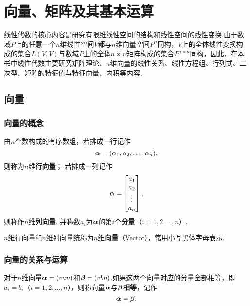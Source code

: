 \chapter{向量、矩阵及其基本运算}
线性代数的核心内容是研究有限维线性空间的结构和线性空间的线性变换.由于数域\(P\)上的任意一个\(n\)维线性空间\(V\)都与\(n\)维向量空间\(P^n\)同构，\(V\)上的全体线性变换构成的集合\(L(V,V)\)与数域\(P\)上的全体\(n \times n\)矩阵构成的集合\(P^{n \times n}\)同构，因此，在本书中线性代数主要研究矩阵理论、\(n\)维向量的线性关系、线性方程组、行列式、二次型、矩阵的特征值与特征向量、内积等内容.

\section{向量}
\subsection{向量的概念}
\begin{definition}
由\(n\)个数构成的有序数组，若排成一行记作\[
\boldsymbol{\alpha} = (\alpha_1, \alpha_2, \dotsc, \alpha_n),
\]则称为\(n\)维\textbf{行向量}；
若排成一列记作\[
\boldsymbol{\alpha} = \begin{bmatrix}
a_1 \\ a_2 \\ \vdots \\ a_n
\end{bmatrix},
\]则称作\(n\)维\textbf{列向量}.
并称数\(a_i\)为\(\boldsymbol{\alpha}\)的第\(i\)个\textbf{分量}（\(i=1,2,\dotsc,n\)）.

\(n\)维行向量和\(n\)维列向量统称为\(n\)维\textbf{向量}（Vector），常用小写黑体字母表示.
\end{definition}

\subsection{向量的关系与运算}
\begin{definition}
对于\(n\)维向量\(\boldsymbol{\alpha} = (v{a}{n})\)和\(\boldsymbol{\beta} = (v{b}{n})\).如果这两个向量对应的分量全部相等，即\(a_i = b_i\)（\(i=1,2,\dotsc,n\)），则称向量\(\boldsymbol{\alpha}\)与\(\boldsymbol{\beta}\)\textbf{相等}，记作\[
\boldsymbol{\alpha} = \boldsymbol{\beta}.
\]
\end{definition}

